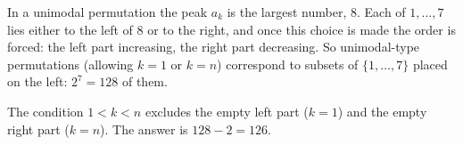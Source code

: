 In a unimodal permutation the peak $a_k$ is the largest number, $8$. Each of $1,\ldots,7$ lies either to the left of $8$ or to the right, and once this choice is made the order is forced: the left part increasing, the right part decreasing. So unimodal-type permutations (allowing $k=1$ or $k=n$) correspond to subsets of $\{1,\ldots,7\}$ placed on the left: $2^7=128$ of them.

The condition $1<k<n$ excludes the empty left part ($k=1$) and the empty right part ($k=n$). The answer is $128-2=\boxed{126}$.
